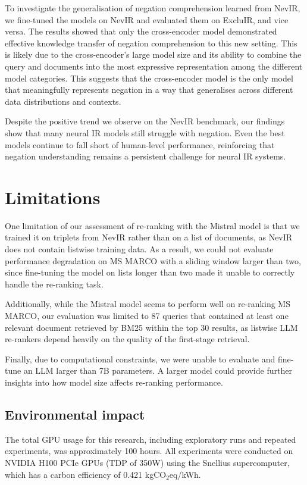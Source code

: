 To investigate the generalisation of negation comprehension learned from NevIR, we fine-tuned the models on NevIR and evaluated them on ExcluIR, and vice versa. The results showed that only the cross-encoder model demonstrated effective knowledge transfer of negation comprehension to this new setting. This is likely due to the cross-encoder's large model size and its ability to combine the query and documents into the most expressive representation among the different model categories. This suggests that the cross-encoder model is the only model that meaningfully represents negation in a way that generalises across different data distributions and contexts.

Despite the positive trend we observe on the NevIR benchmark, our findings show that many neural IR models still struggle with negation. Even the best models continue to fall short of human-level performance, reinforcing that negation understanding remains a persistent challenge for neural IR systems.










\section*{Limitations}
One limitation of our assessment of re-ranking with the Mistral model is that we trained it on triplets from NevIR rather than on a list of documents, as NevIR does not contain listwise training data. As a result, we could not evaluate performance degradation on MS MARCO with a sliding window larger than two, since fine-tuning the model on lists longer than two made it unable to correctly handle the re-ranking task.

Additionally, while the Mistral model seems to perform well on re-ranking MS MARCO, our evaluation was limited to 87 queries that contained at least one relevant document retrieved by BM25 within the top 30 results, as listwise LLM re-rankers depend heavily on the quality of the first-stage retrieval.

Finally, due to computational constraints, we were unable to evaluate and fine-tune an LLM larger than 7B parameters. A larger model could provide further insights into how model size affects re-ranking performance.

\subsection*{Environmental impact}  
The total GPU usage for this research, including exploratory runs and repeated experiments, was approximately 100 hours. All experiments were conducted on NVIDIA H100 PCIe GPUs (TDP of 350W) using the Snellius supercomputer, which has a carbon efficiency of 0.421 kgCO$_2$eq/kWh.

